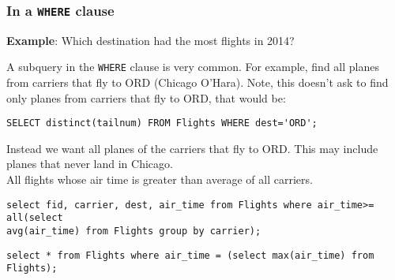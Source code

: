 \documentclass{article}
\begin{document}
\subsubsection*{In a \texttt{WHERE} clause} 





\noindent \textbf{Example}: Which destination had the most flights in 2014?






A subquery in the \texttt{WHERE} clause is very common.  For example, find all planes from carriers that fly to ORD (Chicago O'Hara).  Note, this doesn't ask to find only planes from carriers that fly to ORD, that would be:   










 
 
 
 
 
 
 

  
\begin{lstlisting}[frame=single]  
SELECT distinct(tailnum) FROM Flights WHERE dest='ORD';
\end{lstlisting}                

\noindent Instead we want all planes of the carriers that fly to ORD.  This may include planes that never land in Chicago.\\  

 
  
All flights whose air time is greater than average of all carriers.
\begin{lstlisting}[frame=single]  
 select fid, carrier, dest, air_time from Flights where air_time>= all(select
avg(air_time) from Flights group by carrier);
\end{lstlisting} 
  

  
  
  

  
\begin{lstlisting}[frame=single]  
 select * from Flights where air_time = (select max(air_time) from Flights);
\end{lstlisting} 
 
\end{document}
